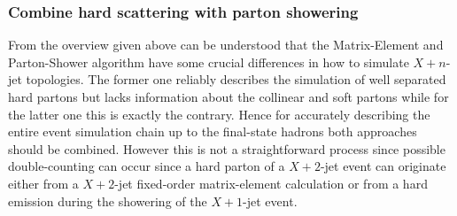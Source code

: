 \subsubsection{Combine hard scattering with parton showering}
From the overview given above can be understood that the Matrix-Element and Parton-Shower algorithm have some crucial differences in how to simulate $X+n$-jet topologies.
The former one reliably describes the simulation of well separated hard partons but lacks information about the collinear and soft partons while for the latter one this is exactly the contrary. Hence for accurately describing the entire event simulation chain up to the final-state hadrons both approaches should be combined. However this is not a straightforward process since possible double-counting can occur since a hard parton of a $X+2$-jet event can originate either from a $X+2$-jet fixed-order matrix-element calculation or from a hard emission during the showering of the $X+1$-jet event.
\\

